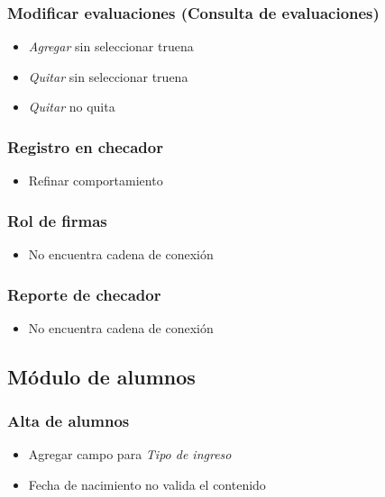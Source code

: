 \documentclass[12pt,spanish,twocolumn]{article}
\begin{document}
\subsubsection{Modificar evaluaciones (Consulta de evaluaciones)}
\begin{itemize}
\item \emph{Agregar} sin seleccionar truena
\item \emph{Quitar} sin seleccionar truena
\item \emph{Quitar} no quita
\end{itemize}

\subsubsection{Registro en checador}
\begin{itemize}
\item Refinar comportamiento
\end{itemize}

\subsubsection{Rol de firmas}
\begin{itemize}
\item No encuentra cadena de conexi\'on
\end{itemize}

\subsubsection{Reporte de checador}
\begin{itemize}
\item No encuentra cadena de conexi\'on
\end{itemize}

\subsection{M\'odulo de alumnos}

\subsubsection{Alta de alumnos}
\begin{itemize}
\item Agregar campo para \emph{Tipo de ingreso}
\item Fecha de nacimiento no valida el contenido
\end{itemize}
\end{document}
